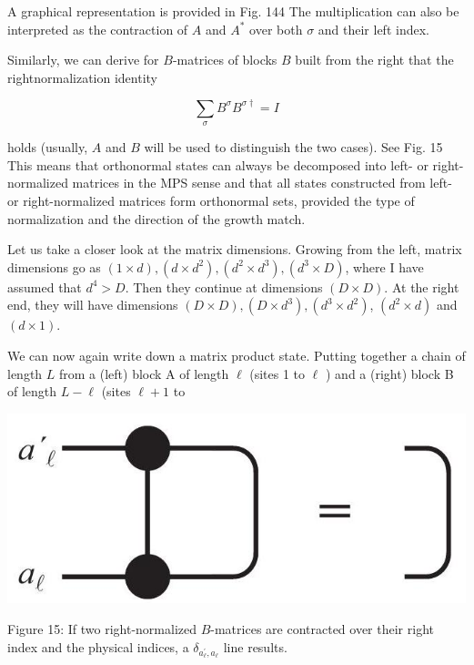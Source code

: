 \documentclass[12pt]{article}
\begin{document}
A graphical representation is provided in Fig. 144 The multiplication can also be interpreted as the contraction of $A$ and $A^{*}$ over both $\sigma$ and their left index.

Similarly, we can derive for $B$-matrices of blocks $B$ built from the right that the rightnormalization identity


\begin{equation*}
\sum_{\sigma} B^{\sigma} B^{\sigma \dagger}=I \tag{71}
\end{equation*}


holds (usually, $A$ and $B$ will be used to distinguish the two cases). See Fig. 15 This means that orthonormal states can always be decomposed into left- or right-normalized matrices in the MPS sense and that all states constructed from left- or right-normalized matrices form orthonormal sets, provided the type of normalization and the direction of the growth match.

Let us take a closer look at the matrix dimensions. Growing from the left, matrix dimensions go as $(1 \times d),\left(d \times d^{2}\right),\left(d^{2} \times d^{3}\right),\left(d^{3} \times D\right)$, where I have assumed that $d^{4}>D$. Then they continue at dimensions $(D \times D)$. At the right end, they will have dimensions $(D \times D),\left(D \times d^{3}\right),\left(d^{3} \times d^{2}\right)$, $\left(d^{2} \times d\right)$ and $(d \times 1)$.

We can now again write down a matrix product state. Putting together a chain of length $L$ from a (left) block A of length $\ell$ (sites 1 to $\ell$ ) and a (right) block B of length $L-\ell$ (sites $\ell+1$ to

\begin{center}
\includegraphics[max width=\textwidth]{2024_05_04_afc4ad226da9ccfe0ac8g-029}
\end{center}

Figure 15: If two right-normalized $B$-matrices are contracted over their right index and the physical indices, a $\delta_{a_{\ell}^{\prime}, a_{\ell}}$ line results.
\end{document}
